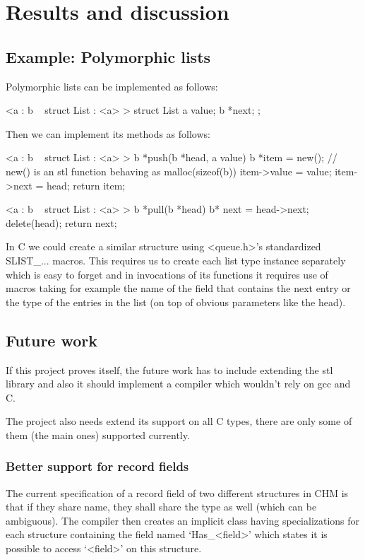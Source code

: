 
\chapter{Results and discussion}

\section{Example: Polymorphic lists}

Polymorphic lists can be implemented as follows:

<a : b ~ struct List : <a> >
struct List
{
    a value;
    b *next;
};

Then we can implement its methods as follows:

<a : b ~ struct List : <a> >
b *push(b *head, a value)
{
    b *item = new(); // new() is an stl function behaving as malloc(sizeof(b))
    item->value = value;
    item->next = head;
    return item;
}

<a : b ~ struct List : <a> >
b *pull(b *head)
{
    b* next = head->next;
    delete(head);
    return next;
}

In C we could create a similar structure using <queue.h>'s standardized SLIST_... macros.
This requires us to create each list type instance separately which is easy to forget
and in invocations of its functions it requires use of macros taking for example the name of the field that
contains the next entry or the type of the entries in the list (on top of obvious parameters like the head).

\section{Future work}

If this project proves itself, the future work has to include extending the stl library and also
it should implement a compiler which wouldn't rely on gcc and C.

The project also needs extend its support on all C types, there are only some of them (the main ones)
supported currently.

\subsection{Better support for record fields}

The current specification of a record field of two different structures in CHM is that if they share name, they shall share the type as well
(which can be ambiguous). The compiler then creates an implicit class having specializations for each structure containing the field
named `Has_<field>' which states it is possible to access `<field>' on this structure.

